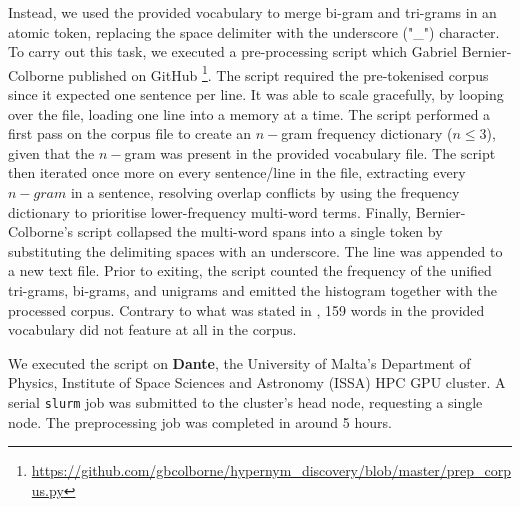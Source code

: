Instead, we used the provided vocabulary to merge bi-gram and tri-grams in an atomic token, replacing the space delimiter with the underscore ("\_") character.  To carry out this task, we executed a pre-processing script which Gabriel Bernier-Colborne published on GitHub \footnote{\url{https://github.com/gbcolborne/hypernym_discovery/blob/master/prep_corpus.py}}.  The script required the pre-tokenised corpus since it expected one sentence per line.  It was able to scale gracefully, by looping over the file, loading one line into a memory at a time.  The script performed a first pass on the corpus file to create an $n-$gram frequency dictionary ($n \leq 3$), given that the $n-$gram was present in the provided vocabulary file. The script then iterated once more on every sentence/line in the file, extracting every $n-gram$ in a sentence, resolving overlap conflicts by using the frequency dictionary to prioritise lower-frequency multi-word terms.  Finally, Bernier-Colborne's script collapsed the multi-word spans into a single token by substituting the delimiting spaces with an underscore.  The line was appended to a new text file.  Prior to exiting, the script counted the frequency of the unified tri-grams, bi-grams, and unigrams and emitted the histogram together with the processed corpus.  Contrary to what was stated in \citep{camacho2018semeval}, 159 words in the provided vocabulary did not feature at all in the corpus.

We executed the script on \textbf{Dante}, the University of Malta's Department of Physics, Institute of Space Sciences and Astronomy (ISSA) HPC GPU cluster.  A serial \texttt{slurm} job was submitted to the cluster's head node, requesting a single node.  The preprocessing job was completed in around 5 hours.

